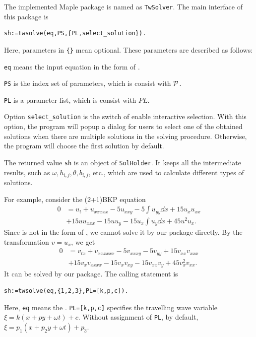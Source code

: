 The implemented Maple package is named as \texttt{TwSolver}. The main interface of this package is 
\begin{verbatim}
sh:=twsolve(eq,PS,{PL,select_solution}).
\end{verbatim}
Here, parameters in \verb|{}| mean optional. These parameters are described as follows: 
\begin{compactitem}[\textbullet]
\item \texttt{eq} means the input equation in the form of .
\item \texttt{PS} is the index set of parameters, which is consist with $\mathcal{P}$. 
\item \texttt{PL} is a parameter list, which is consist with $PL$.
\item Option \texttt{select\_solution} is the switch of enable interactive selection. With this option, the program will popup a dialog for users to select one of the obtained solutions when there are multiple solutions in the solving procedure. Otherwise, the program will choose the first solution by default.
\item The returned value \texttt{sh} is an object of \texttt{SolHolder}. It keeps all the intermediate results, such as $\omega,h_{i,j},\theta,b_{i,j}$, etc., which are used to calculate different types of solutions. 
\end{compactitem}
    
For example, consider the (2+1)BKP equation \CITEbaBKP
\begin{equation}
\begin{split}
0&=u_t+u_{xxxxx}-5u_{xxy}-5\int{u_{yy}\dd{x}}+15u_xu_{xx}\\
&+15uu_{xxx}-15uu_y-15u_x\int{u_y\dd{x}}+45u^2u_x. \label{BKP}
\end{split}
\end{equation}
Since  is not in the form of , we cannot solve it by our package directly. By the transformation $v=u_x$, we get 
\begin{equation}
\begin{split}
0&=v_{tx}+v_{xxxxxx}-5v_{xxxy}-5v_{yy}+15v_{xx}v_{xxx}\\
&+15v_xv_{xxxx}-15v_xv_{xy}-15v_{xx}v_y+45v_x^2v_{xx}. \label{BKP-T}
\end{split}
\end{equation}
It can be solved by our package. The calling statement is
\begin{verbatim}
sh:=twsolve(eq,{1,2,3},PL=[k,p,c]).
\end{verbatim}
Here, \texttt{eq} means the . \texttt{PL=[k,p,c]} specifies the travelling wave variable $\xi=k(x+py+\omega t)+c$. Without assignment of \texttt{PL}, by default, $\xi=p_1(x+p_2 y+\omega t)+p_3$. 

